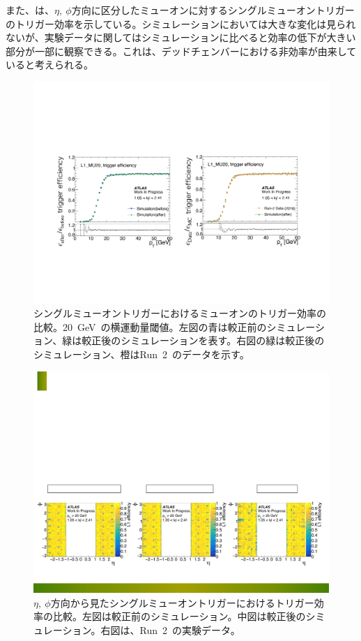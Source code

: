 また、は、$\eta,~\phi$方向に区分したミューオンに対するシングルミューオントリガーのトリガー効率を示している。シミュレーションにおいては大きな変化は見られないが、実験データに関してはシミュレーションに比べると効率の低下が大きい部分が一部に観察できる。これは、デッドチェンバーにおける非効率が由来していると考えられる。
\begin{figure}[tbp]
        \centering   
        \includegraphics[width=\textwidth,page=1]{img/rec/trig.pdf}
        \caption[シングルミューオントリガーにおけるミューオンのトリガー効率の比較]{シングルミューオントリガーにおけるミューオンのトリガー効率の比較。20~GeV~の横運動量閾値。左図の青は較正前のシミュレーション、緑は較正後のシミュレーションを表す。右図の緑は較正後のシミュレーション、橙はRun~2~のデータを示す。}\label{fig:singletri}
\end{figure}

\begin{figure}[tbp]
        \centering   
        \includegraphics[width=\textwidth,page=1]{img/rec/tri1.pdf}
        \caption[$\eta, \phi$方向から見たシングルミューオントリガーにおけるトリガー効率の比較]{$\eta,~\phi$方向から見たシングルミューオントリガーにおけるトリガー効率の比較。左図は較正前のシミュレーション。中図は較正後のシミュレーション。右図は、Run~2~の実験データ。}\label{fig:singletriep}
\end{figure}

